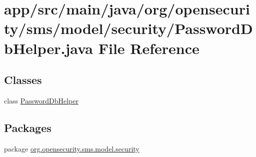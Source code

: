 \hypertarget{a00026}{\section{app/src/main/java/org/opensecurity/sms/model/security/\+Password\+Db\+Helper.java File Reference}
\label{a00026}
}
\subsection*{Classes}
\begin{DoxyCompactItemize}
\item 
class \hyperlink{a00012}{Password\+Db\+Helper}
\end{DoxyCompactItemize}
\subsection*{Packages}
\begin{DoxyCompactItemize}
\item 
package \hyperlink{a00040}{org.\+opensecurity.\+sms.\+model.\+security}
\end{DoxyCompactItemize}
